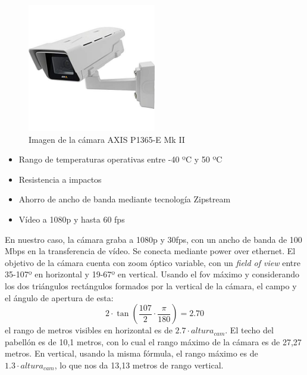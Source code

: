 \begin{figure}
    \centering
    \includegraphics[width=0.5\textwidth]{images/camara}
    \caption{Imagen de la cámara AXIS P1365-E Mk II}
    \label{fig:camara}
\end{figure}

\begin{itemize}
    \item Rango de temperaturas operativas entre -40 ºC y 50 ºC
    \item Resistencia a impactos
    \item Ahorro de ancho de banda mediante tecnología Zipstream
    \item Vídeo a 1080p y hasta 60 fps
\end{itemize}

En nuestro caso, la cámara graba a 1080p y 30fps, con un ancho de banda de 100 Mbps en la transferencia de vídeo. Se conecta mediante power over ethernet. El objetivo de la cámara cuenta con zoom óptico variable, con un \textit{field of view} entre 35-107º en horizontal y 19-67º en vertical. Usando el fov máximo y considerando los dos triángulos rectángulos formados por la vertical de la cámara, el campo y el ángulo de apertura de esta:
\[
    2 \cdot \tan(\frac{107}{2} \cdot \frac{\pi}{180}) = 2.70
\]
el rango de metros visibles en horizontal es de $2.7\cdot altura_{cam}$. El techo del pabellón es de 10,1 metros, con lo cual el rango máximo de la cámara es de 27,27 metros. En vertical, usando la misma fórmula, el rango máximo es de $1.3 \cdot altura_{cam}$, lo que nos da 13,13 metros de rango vertical.

